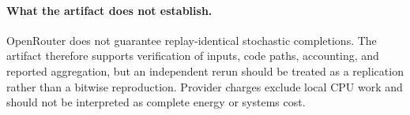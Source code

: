 \paragraph{What the artifact does not establish.}
OpenRouter does not guarantee replay-identical stochastic completions. The
artifact therefore supports verification of inputs, code paths, accounting,
and reported aggregation, but an independent rerun should be treated as a
replication rather than a bitwise reproduction. Provider charges exclude local
CPU work and should not be interpreted as complete energy or systems cost.
